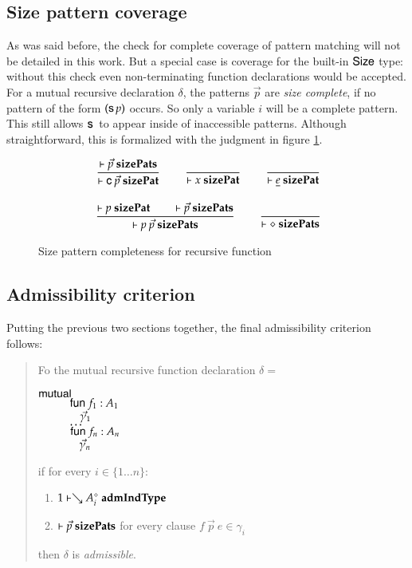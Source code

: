 \subsection{Size pattern coverage}

As was said before, the check for complete coverage of pattern matching will not be detailed in this work. 
But a special case is coverage for the built-in $\mathsf{Size}$ type: without this check even non-terminating function declarations would be accepted. 
For a mutual recursive declaration $\delta$, the patterns $\vec{p}$ are \emph{size complete}, if no pattern of the form $(\mathsf{s}\, p)$ occurs. So only a variable $i$ will be a complete pattern. This still allows $\mathsf{s}\,$ to appear inside of inaccessible patterns.
Although straightforward, this is formalized with the judgment in figure \ref{spj}.

\begin{figure}[htp]
\begin{gather*}
\ \dfrac{\vdash\vec{p}\mbox{ \textbf{sizePats}}}{\vdash\mathsf{c} \: \vec{p}\mbox{ \textbf{sizePat}}}
\qquad
\ \dfrac{}{\vdash x\mbox{ \textbf{sizePat}}}
\qquad
\ \dfrac{}{\vdash\underline{e}\mbox{ \textbf{sizePat}}}
\\[2ex]
\ \dfrac{\vdash p\mbox{ \textbf{sizePat}} \qquad \vdash\vec{p}\mbox{ \textbf{sizePats}}}{\vdash p \: \vec{p}\mbox{ \textbf{sizePats}}}
\qquad
\ \dfrac{}{\vdash\diamond\mbox{ \textbf{sizePats}}}
\end{gather*}
\caption{Size pattern completeness for recursive function}
\label{spj}
\end{figure}


\subsection{Admissibility criterion}
Putting the previous two sections together,
the final admissibility criterion follows:
\begin{quote}
Fo the mutual recursive function declaration $\delta =$
\begin{bsp}
$\mathsf{mutual}\:$\\
$\spcx \fun f_1 : A_1 $\\
$\spcx \spc \vec{\gamma}_1$\\
$\spcx \ldots$\\
$\spcx \fun f_n : A_n $\\
$\spcx \spc \vec{\gamma}_n$
\end{bsp}
if  for every $i \in \{1 \ldots n \}$:
\begin{enumerate}
\item
$1\vdash\searrow A_i^{\diamond}\mbox{ \textbf{admIndType}}$
\item
$\vdash\vec{p}\mbox{ \textbf{sizePats}}$ for every clause $f \: \vec{p} \: e \in \gamma_i$
\end{enumerate}
then $\delta$ is \emph{admissible}.
\end{quote}

